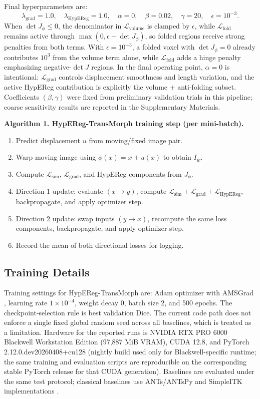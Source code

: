 \documentclass[11pt,a4paper]{article}
\begin{document}
Final hyperparameters are:
\[
\lambda_{\mathrm{grad}} = 1.0, \quad
\lambda_{\mathrm{HypEReg}} = 1.0, \quad
\alpha = 0, \quad
\beta = 0.02, \quad
\gamma = 20, \quad
\epsilon = 10^{-3}.
\]
When \(\det J_\phi \le 0\), the denominator in \(\mathcal{L}_{\mathrm{volume}}\) is clamped by \(\epsilon\), while \(\mathcal{L}_{\mathrm{fold}}\) remains active through \(\max(0,\epsilon-\det J_\phi)\), so folded regions receive strong penalties from both terms. With \(\epsilon=10^{-3}\), a folded voxel with \(\det J_\phi=0\) already contributes \(10^3\) from the volume term alone, while \(\mathcal{L}_{\mathrm{fold}}\) adds a hinge penalty emphasizing negative-\(\det J\) regions. In the final operating point, \(\alpha=0\) is intentional: \(\mathcal{L}_{\mathrm{grad}}\) controls displacement smoothness and length variation, and the active HypEReg contribution is explicitly the volume + anti-folding subset. Coefficients \((\beta,\gamma)\) were fixed from preliminary validation trials in this pipeline; coarse sensitivity results are reported in the Supplementary Materials.

\noindent\textbf{Algorithm 1. HypEReg-TransMorph training step (per mini-batch).}
\begin{enumerate}[leftmargin=1.4em]
\item Predict displacement \(u\) from moving/fixed image pair.
\item Warp moving image using \(\phi(x)=x+u(x)\) to obtain \(I_w\).
\item Compute \(\mathcal{L}_{\mathrm{sim}}\), \(\mathcal{L}_{\mathrm{grad}}\), and HypEReg components from \(J_\phi\).
\item Direction 1 update: evaluate \((x\rightarrow y)\), compute \(\mathcal{L}_{\mathrm{sim}}+\mathcal{L}_{\mathrm{grad}}+\mathcal{L}_{\mathrm{HypEReg}}\), backpropagate, and apply optimizer step.
\item Direction 2 update: swap inputs \((y\rightarrow x)\), recompute the same loss components, backpropagate, and apply optimizer step.
\item Record the mean of both directional losses for logging.
\end{enumerate}

\subsection{Training Details}
Training settings for HypEReg-TransMorph are: Adam optimizer with AMSGrad \citep{kingma2014adam,reddi2018amsgrad}, learning rate \(1\times10^{-4}\), weight decay \(0\), batch size 2, and 500 epochs. The checkpoint-selection rule is best validation Dice. The current code path does not enforce a single fixed global random seed across all baselines, which is treated as a limitation. Hardware for the reported runs is NVIDIA RTX PRO 6000 Blackwell Workstation Edition (97,887 MiB VRAM), CUDA 12.8, and PyTorch 2.12.0.dev20260408+cu128 (nightly build used only for Blackwell-specific runtime; the same training and evaluation scripts are reproducible on the corresponding stable PyTorch release for that CUDA generation). Baselines are evaluated under the same test protocol; classical baselines use ANTs/ANTsPy and SimpleITK implementations \citep{avants2008ants,antspyx2024,simpleitk2013}.
\end{document}
